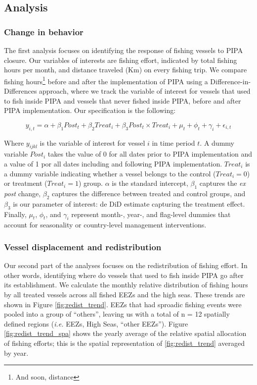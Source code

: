 \documentclass[]{article}
\let\rmarkdownfootnote\footnote%
\def\footnote{\protect\rmarkdownfootnote}
\begin{document}
\subsection{Analysis}\label{analysis}

\subsubsection{Change in behavior}\label{change-in-behavior}

The first analysis focuses on identifying the response of fishing
vessels to PIPA closure. Our variables of interests are fishing effort,
indicated by total fishing hours per month, and distance traveled (Km)
on every fishing trip. We compare fishing hours\footnote{And soon,
  distance} before and after the implementation of PIPA using a
Difference-in-Differences approach, where we track the variable of
interest for vessels that used to fish inside PIPA and vessels that
never fished inside PIPA, before and after PIPA implementation. Our
specification is the following:

\[
y_{i,t} = \alpha + \beta_1 Post_t + \beta_2 Treat_i + \beta_3 Post_t \times Treat_i + \mu_t + \phi_t + \gamma_i + \epsilon_{i,t}
\]

Where \(y_{ijkl}\) is the variable of interest for vessel \(i\) in time
period \(t\). A dummy variable \(Post_i\) takes the value of 0 for all
dates prior to PIPA implementation and a value of 1 por all dates
including and following PIPA implementation. \(Treat_i\) is a dummy
variable indicating whether a vessel belongs to the control
(\(Treat_i = 0\)) or treatment (\(Treat_i = 1\)) group. \(\alpha\) is
the standard intercept, \(\beta_1\) captures the \emph{ex post} change,
\(\beta_2\) captures the difference between treated and control groups,
and \(\beta_3\) is our parameter of interest: de DiD estimate capturing
the treatment effect. Finally, \(\mu_t\), \(\phi_t\), and \(\gamma_i\)
represent month-, year-, and flag-level dummies that account for
seasonality or country-level management interventions.

\subsubsection{Vessel displacement and
redistribution}\label{vessel-displacement-and-redistribution}

Our second part of the analyses focuses on the redistribution of fishing
effort. In other words, identifying where do vessels that used to fish
inside PIPA go after its establishment. We calculate the monthly
relative distribution of fishing hours by all treated vessels across all
fished EEZs and the high seas. These trends are shown in Figure
\ref{fig:redist_trend}. EEZs that had sproadic fishing events were
pooled into a group of ``others'', leaving us with a total of n = 12
spatially defined regions (\emph{i.e.} EEZs, High Seas, ``other EEZs'').
Figure \ref{fig:redist_trend_spa} shows the yearly average of the
relative spatial allocation of fishing efforts; this is the spatial
representation of \ref{fig:redist_trend} averaged by year.
\end{document}
